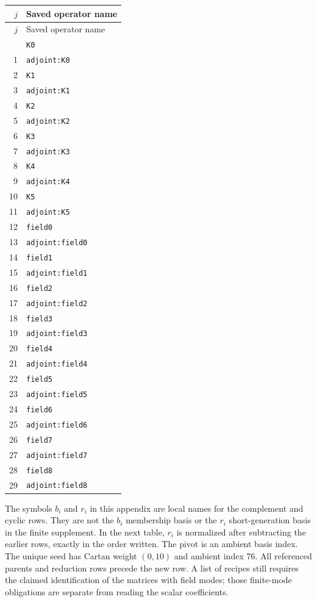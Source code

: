\begingroup\small
\setlength{\tabcolsep}{5pt}
\begin{longtable}{@{}rl@{}}
\toprule
$j$ & Saved operator name\\
\midrule\endfirsthead
\toprule
$j$ & Saved operator name\\
\midrule\endhead
\bottomrule\endfoot
0 & \texttt{K0}\\
1 & \texttt{adjoint:K0}\\
2 & \texttt{K1}\\
3 & \texttt{adjoint:K1}\\
4 & \texttt{K2}\\
5 & \texttt{adjoint:K2}\\
6 & \texttt{K3}\\
7 & \texttt{adjoint:K3}\\
8 & \texttt{K4}\\
9 & \texttt{adjoint:K4}\\
10 & \texttt{K5}\\
11 & \texttt{adjoint:K5}\\
12 & \texttt{field0}\\
13 & \texttt{adjoint:field0}\\
14 & \texttt{field1}\\
15 & \texttt{adjoint:field1}\\
16 & \texttt{field2}\\
17 & \texttt{adjoint:field2}\\
18 & \texttt{field3}\\
19 & \texttt{adjoint:field3}\\
20 & \texttt{field4}\\
21 & \texttt{adjoint:field4}\\
22 & \texttt{field5}\\
23 & \texttt{adjoint:field5}\\
24 & \texttt{field6}\\
25 & \texttt{adjoint:field6}\\
26 & \texttt{field7}\\
27 & \texttt{adjoint:field7}\\
28 & \texttt{field8}\\
29 & \texttt{adjoint:field8}\\
\end{longtable}
\endgroup
The symbols $b_i$ and $r_i$ in this appendix are local names for
the complement and cyclic rows. They are not the $b_i$ membership basis
or the $r_i$ short-generation basis in the finite supplement.
In the next table, $r_i$ is normalized after subtracting the
earlier rows, exactly in the order written. The pivot is an ambient basis
index. The unique seed has Cartan weight $(0,10)$ and ambient index 76.
All referenced parents and reduction rows precede the new row. A list of
recipes still requires the claimed identification of the matrices with
field modes; those finite-mode obligations are separate from reading
the scalar coefficients.

